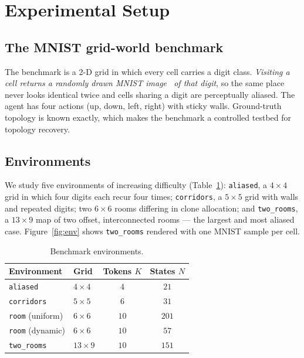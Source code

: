 \documentclass[twocolumn,10pt]{article}
\begin{document}
\section{Experimental Setup}
\label{sec:setup}

\subsection{The MNIST grid-world benchmark}
The benchmark is a 2-D grid in which every cell carries a digit class.
\emph{Visiting a cell returns a randomly drawn MNIST image~\cite{lecun1998} of
that digit}, so the same place never looks identical twice and cells sharing a
digit are perceptually aliased. The agent has four actions (up, down, left,
right) with sticky walls. Ground-truth topology is known exactly, which makes
the benchmark a controlled testbed for topology recovery.

\subsection{Environments}
We study five environments of increasing difficulty
(Table~\ref{tab:envs}): \texttt{aliased}, a $4\times4$ grid in which four
digits each recur four times; \texttt{corridors}, a $5\times5$ grid with walls
and repeated digits; two $6\times6$ rooms differing in clone allocation; and
\texttt{two\_rooms}, a $13\times9$ map of two offset, interconnected rooms ---
the largest and most aliased case. Figure~\ref{fig:env} shows
\texttt{two\_rooms} rendered with one MNIST sample per cell.

\begin{table}[t]
\centering
\caption{Benchmark environments.}
\label{tab:envs}
\small
\begin{tabular}{@{}llcc@{}}
\toprule
\textbf{Environment} & \textbf{Grid} & \textbf{Tokens $K$} & \textbf{States $N$}\\
\midrule
\texttt{aliased}            & $4\times4$  & $4$  & $21$ \\
\texttt{corridors}          & $5\times5$  & $6$  & $31$ \\
\texttt{room} (uniform)     & $6\times6$  & $10$ & $201$ \\
\texttt{room} (dynamic)     & $6\times6$  & $10$ & $57$ \\
\texttt{two\_rooms}         & $13\times9$ & $10$ & $151$ \\
\bottomrule
\end{tabular}
\end{table}
\end{document}
